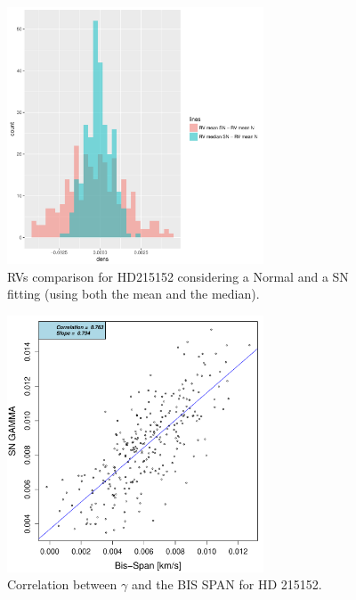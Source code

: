 \documentclass{aa}
\begin{document}
%
\begin{figure}[htbp]
   \centering
\includegraphics[height = 3in]{[0]HD21515_HistogramsDiff.pdf} 
   \caption{RVs comparison for HD215152 considering a Normal and a SN fitting (using both the mean and the median).}
   \label{fig:HD215152:RV}
\end{figure}
%
\begin{figure}[htbp]
   \centering
\includegraphics[height = 3in]{HD21515_[2]gamma_vs_bisspan.pdf} 
   \caption{Correlation between $\gamma$ and the BIS SPAN for HD 215152.}
   \label{fig:HD215152:corr.gamma}
\end{figure}
%
\end{document}
